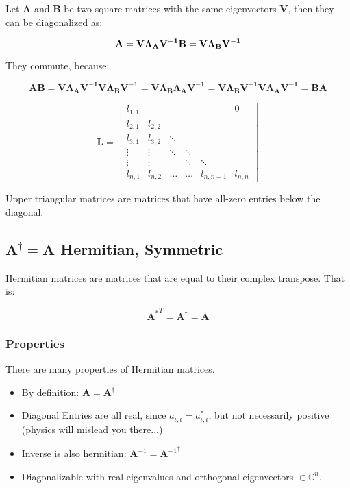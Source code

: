 Let $\mathbf{A}$ and $\mathbf{B}$ be two square matrices with the same eigenvectors $\mathbf{V}$, then they can be diagonalized as:

\begin{equation}
\mathbf{A} = \mathbf{V\Lambda_A V^{-1}}\\
\mathbf{B} = \mathbf{V\Lambda_B V^{-1}}
\end{equation}

They commute, because:

\begin{equation}
\mathbf{AB} = \mathbf{V\Lambda_A V^{-1}V\Lambda_B V^{-1}} = \mathbf{V\Lambda_B \Lambda_A V^{-1}} = \mathbf{V\Lambda_B V^{-1}V\Lambda_A V^{-1}} = \mathbf{BA} 
\end{equation}

\begin{equation}
\mathbf{L} = \left[\begin{array}{cccccc} l_{1,1}&&&&&0\\l_{2,1}&l_{2,2}&&&&\\l_{3,1}&l_{3,2}&\ddots&&&\\  \vdots&\vdots&\ddots&\ddots&&\\ \vdots&\vdots&&\ddots&\ddots&\\  l_{n,1}&l_{n,2}&\hdots&\hdots&l_{n,n-1}&l_{n,n}\end{array}\right]
\end{equation}

Upper triangular matrices are matrices that have all-zero entries below the diagonal.


\subsection{$\mathbf{A}^{\dagger} = \mathbf{A}$ Hermitian, Symmetric}
\label{sec:hermitian}
Hermitian matrices are matrices that are equal to their complex transpose. That is:

\begin{equation}
{\mathbf{A}^{*}}^T = \mathbf{A}^\dagger = \mathbf{A} 
\end{equation}

\subsubsection{Properties}
There are many properties of Hermitian matrices. 
\begin{itemize}
\item By definition: $\mathbf{A} = \mathbf{A}^\dagger$
\item Diagonal Entries are all real, since $a_{i,i} = a_{i,i}^*$, but not necessarily positive (physics will mislead you there...)
\item Inverse is also hermitian:  $\mathbf{A}^{-1} ={ \mathbf{A}^{-1}}^\dagger$
\item Diagonalizable with real eigenvalues and orthogonal eigenvectors $\in \mathbb{C}^n$.
\end{itemize}


